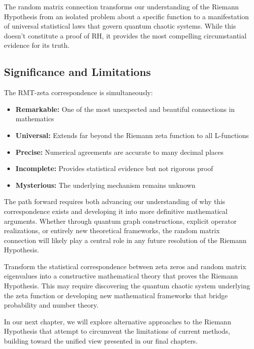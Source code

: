 \begin{highlight}
The random matrix connection transforms our understanding of the Riemann Hypothesis from an isolated problem about a specific function to a manifestation of universal statistical laws that govern quantum chaotic systems. While this doesn't constitute a proof of RH, it provides the most compelling circumstantial evidence for its truth.
\end{highlight}

\subsection{Significance and Limitations}

The RMT-zeta correspondence is simultaneously:
\begin{itemize}
\item \textbf{Remarkable:} One of the most unexpected and beautiful connections in mathematics
\item \textbf{Universal:} Extends far beyond the Riemann zeta function to all L-functions  
\item \textbf{Precise:} Numerical agreements are accurate to many decimal places
\item \textbf{Incomplete:} Provides statistical evidence but not rigorous proof
\item \textbf{Mysterious:} The underlying mechanism remains unknown
\end{itemize}

The path forward requires both advancing our understanding of why this correspondence exists and developing it into more definitive mathematical arguments. Whether through quantum graph constructions, explicit operator realizations, or entirely new theoretical frameworks, the random matrix connection will likely play a central role in any future resolution of the Riemann Hypothesis.

\begin{openproblem}
Transform the statistical correspondence between zeta zeros and random matrix eigenvalues into a constructive mathematical theory that proves the Riemann Hypothesis. This may require discovering the quantum chaotic system underlying the zeta function or developing new mathematical frameworks that bridge probability and number theory.
\end{openproblem}

In our next chapter, we will explore alternative approaches to the Riemann Hypothesis that attempt to circumvent the limitations of current methods, building toward the unified view presented in our final chapters.
